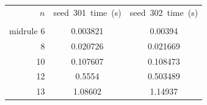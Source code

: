 \begin{tabular}{rcc}
\toprule
$n$ & seed~301~time~(s) & seed~302~time~(s) \\ \\midrule
6 & 0.003821 & 0.00394 \\ 
8 & 0.020726 & 0.021669 \\ 
10 & 0.107607 & 0.108473 \\ 
12 & 0.5554 & 0.503489 \\ 
13 & 1.08602 & 1.14937 \\ 
\bottomrule
\end{tabular}
